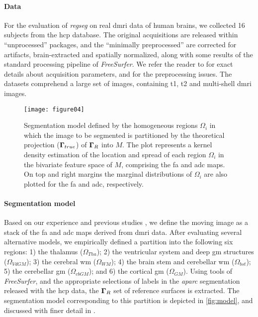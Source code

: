 \paragraph*{Data}
For the evaluation of \emph{regseg} on real \gls*{dmri} data of human brains,
  we collected 16 subjects from the \gls*{hcp} database.
The original acquisitions are released within ``unprocessed'' packages, and
  the ``minimally preprocessed'' are corrected for artifacts, brain-extracted
  and spatially normalized, along with some results of the standard processing
  pipeline of \emph{FreeSurfer}.
We refer the reader to \citep{essen_human_2012} for exact details about acquisition
  parameters, and \citep{glasser_minimal_2013} for the preprocessing issues.
The datasets comprehend a large set of images, containing \gls*{t1}, \gls*{t2} and
  multi-shell \gls*{dmri} images.

\begin{figure}
\texttt{[image: figure04]}
\caption{Segmentation model defined by the homogeneous regions $\Omega_i$ in which
  the image to be segmented is partitioned by the theoretical projection 
  ($\boldsymbol{\Gamma}_{true}$) of $\boldsymbol{\Gamma}_R$ into $M$.
The plot represents a kernel density estimation of the location and spread of
  each region $\Omega_i$ in the bivariate feature space of $M$, comprising 
  the \gls*{fa} and \gls*{adc} maps.
On top and right margins the marginal distributions of $\Omega_i$ are also plotted for
  the \gls*{fa} and \gls*{adc}, respectively.
}\label{fig:model}
\end{figure}

\paragraph*{Segmentation model}
Based on our experience \citep{esteban_brain_2012} and previous studies \citep{ennis_orthogonal_2006},
  we define the moving image as a stack of the \gls*{fa} and \gls*{adc} maps derived
  from \gls*{dmri} data.
After evaluating several alternative models, we empirically defined a partition \omegaset{}
  into the following six regions:
  1) the thalamus ($\Omega_{Tha}$);
  2) the ventricular system and deep \gls*{gm} structures ($\Omega_{VdGM}$);
  3) the cerebral \gls*{wm} ($\Omega_{WM}$);
  4) the brain stem and cerebellar \gls*{wm} ($\Omega_{bst}$);
	5) the cerebellar \gls*{gm} ($\Omega_{cbGM}$); and
	6) the cortical \gls*{gm} ($\Omega_{GM}$).
Using tools of \emph{FreeSurfer}, and the appropriate selections of labels in the 
  \emph{aparc} segmentation released with the \gls*{hcp} data, the $\boldsymbol{\Gamma}_R$ set of
  reference surfaces is extracted.
The segmentation model corresponding to this partition is depicted in \autoref{fig:model},
  and discussed with finer detail in .


